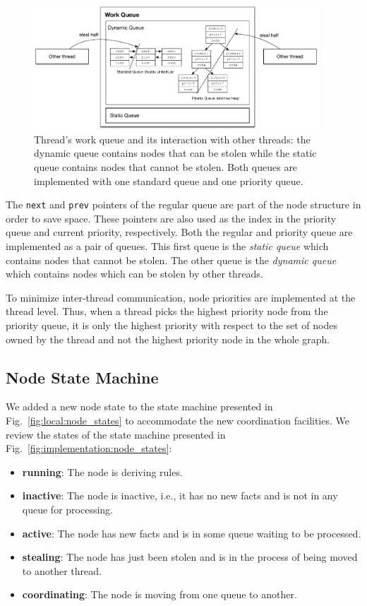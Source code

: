 \begin{figure}[t]
\centering
\includegraphics[width=0.95\textwidth]{figures/implementation/work_queue.pdf}
\caption{Thread's work queue and its interaction with other threads: the dynamic queue contains nodes that can be
   stolen while the static queue contains nodes that cannot be stolen. Both
   queues are implemented with one standard queue and one priority queue.}
\label{fig:implementation:work_queue}
\end{figure}

The \texttt{next} and \texttt{prev} pointers of the regular queue are part of
the node structure in order to save space. These pointers are also used as the
index in the priority queue and current priority, respectively. Both the regular
and priority queue are implemented as a pair of queues.  This first queue is the
\emph{static queue} which contains nodes that cannot be stolen.  The other queue
is the \emph{dynamic queue} which contains nodes which can be stolen by other
threads.

To minimize inter-thread communication, node priorities are implemented at the
thread level. Thus, when a thread picks the highest priority node from the
priority queue, it is only the highest priority with respect to the set of nodes
owned by the thread and not the highest priority node in the whole graph.

\subsection{Node State Machine}\label{sec:node_state_machine}

We added a new node state to the state machine presented in
Fig.~\ref{fig:local:node_states} to accommodate the new coordination facilities.
We review the states of the state machine presented in
Fig.~\ref{fig:implementation:node_states}:

\begin{itemize}
   \item \textbf{running}: The node is deriving rules.
   \item \textbf{inactive}: The node is inactive, i.e., it has no new facts and is not in any
   queue for processing.
   \item \textbf{active}: The node has new facts and is in some queue waiting
   to be processed.
   \item \textbf{stealing}: The node has just been stolen and is in the process of being
   moved to another thread.
   \item \textbf{coordinating}: The node is moving from one queue to another.
\end{itemize}

